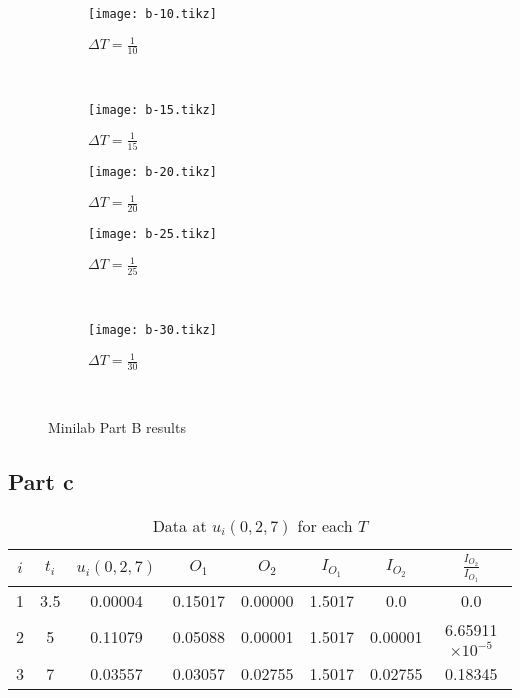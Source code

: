 \documentclass[12pt]{article}
\begin{document}
\begin{figure}[H]
  \centering
  \begin{subfigure}{.5\textwidth}
    \texttt{[image: b-10.tikz]}
    \caption{$\Delta T=\frac{1}{10}$}
    \label{fig:mini_10}
  \end{subfigure}~
  \begin{subfigure}{.5\textwidth}
    \texttt{[image: b-15.tikz]}
    \caption{$\Delta T=\frac{1}{15}$}
    \label{fig:mini_15}
  \end{subfigure}
  \begin{subfigure}{.5\textwidth}
    \texttt{[image: b-20.tikz]}
    \caption{$\Delta T=\frac{1}{20}$}
    \label{fig:mini_20}
  \end{subfigure}
  \begin{subfigure}{.5\textwidth}
    \texttt{[image: b-25.tikz]}
    \caption{$\Delta T=\frac{1}{25}$}
    \label{fig:mini_25}
  \end{subfigure}~
  \begin{subfigure}{.5\textwidth}
    \texttt{[image: b-30.tikz]}
    \caption{$\Delta T=\frac{1}{30}$}
    \label{fig:mini_30}
  \end{subfigure}~
  \caption{Minilab Part B results}
  \label{fig:mini_c}
\end{figure}

\subsection{Part c}
\begin{table}[H]
  \centering
  \begin{tabular}[H]{cccccccc}
    \hline
    $i$ & $t_i$ & $u_i(0,2,7)$ & $O_1$ & $O_2$ & $I_{O_1}$ & $I_{O_2}$ & $\frac{I_{O_2}}{I_{O_1}}$ \\
    \hline
    1 & 3.5 & 0.00004 & 0.15017 & 0.00000 & 1.5017 & 0.0     & 0.0 \\
    2 & 5   & 0.11079 & 0.05088 & 0.00001 & 1.5017 & 0.00001 & 6.65911 $\times 10^{-5}$	\\
    3 & 7   & 0.03557 & 0.03057 & 0.02755 & 1.5017 & 0.02755 & 0.18345 \\
    \hline
  \end{tabular}
  \caption{Data at $u_i(0,2,7)$ for each $T$}
  \label{tab:mini_c_u}
\end{table}
\end{document}
